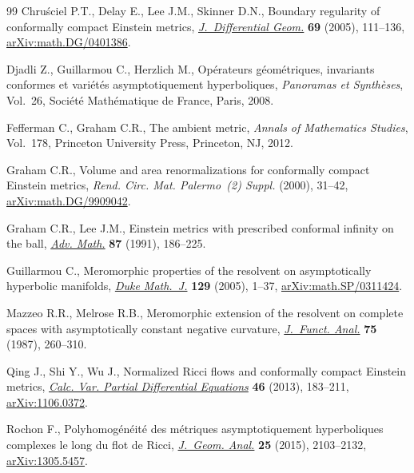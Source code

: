 \documentclass[pdftex]{sigma}
\numberwithin{equation}{section}
\begin{document}
\begin{thebibliography}{99}
Chru\'{s}ciel P.T., Delay E., Lee J.M., Skinner D.N., Boundary regularity of
 conformally compact {E}instein metrics, \href{https://doi.org/10.4310/jdg/1121540341}{\textit{J.~Differential Geom.}}
 \textbf{69} (2005), 111--136, \href{https://arxiv.org/abs/math.DG/0401386}{arXiv:math.DG/0401386}.

Djadli Z., Guillarmou C., Herzlich M., Op\'{e}rateurs g\'{e}om\'{e}triques,
 invariants conformes et vari\'{e}t\'{e}s asymptotiquement hyperboliques,
 \textit{Panoramas et Synth\`eses}, Vol.~26, Soci\'{e}t\'{e} Math\'{e}matique
 de France, Paris, 2008.

Fefferman C., Graham C.R., The ambient metric, \textit{Annals of Mathematics
 Studies}, Vol.~178, Princeton University Press, Princeton, NJ, 2012.

Graham C.R., Volume and area renormalizations for conformally compact
 {E}instein metrics, \textit{Rend. Circ. Mat. Palermo~(2) Suppl.} (2000),
 31--42, \href{https://arxiv.org/abs/math.DG/9909042}{arXiv:math.DG/9909042}.

Graham C.R., Lee J.M., Einstein metrics with prescribed conformal infinity on
 the ball, \href{https://doi.org/10.1016/0001-8708(91)90071-E}{\textit{Adv. Math.}} \textbf{87} (1991), 186--225.

Guillarmou C., Meromorphic properties of the resolvent on asymptotically
 hyperbolic manifolds, \href{https://doi.org/10.1215/S0012-7094-04-12911-2}{\textit{Duke Math.~J.}} \textbf{129} (2005), 1--37,
 \href{https://arxiv.org/abs/math.SP/0311424}{arXiv:math.SP/0311424}.

Mazzeo R.R., Melrose R.B., Meromorphic extension of the resolvent on complete
 spaces with asymptotically constant negative curvature, \href{https://doi.org/10.1016/0022-1236(87)90097-8}{\textit{J.~Funct.
 Anal.}} \textbf{75} (1987), 260--310.

Qing J., Shi Y., Wu J., Normalized {R}icci flows and conformally compact
 {E}instein metrics, \href{https://doi.org/10.1007/s00526-011-0479-7}{\textit{Calc. Var. Partial Differential Equations}}
 \textbf{46} (2013), 183--211, \href{https://arxiv.org/abs/1106.0372}{arXiv:1106.0372}.

Rochon F., Polyhomog\'{e}n\'{e}it\'{e} des m\'{e}triques asymptotiquement
 hyperboliques complexes le long du flot de {R}icci, \href{https://doi.org/10.1007/s12220-014-9505-2}{\textit{J.~Geom. Anal.}}
 \textbf{25} (2015), 2103--2132, \href{https://arxiv.org/abs/1305.5457}{arXiv:1305.5457}.


\end{thebibliography}
\end{document}
